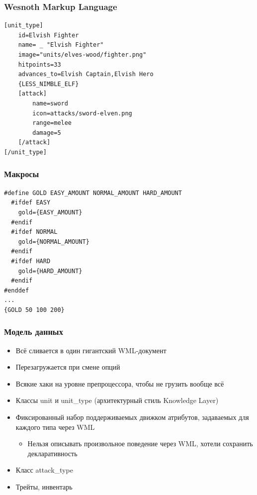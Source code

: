 \documentclass{../../slides-style}
\begin{document}
    \begin{frame}[fragile]
        \frametitle{Wesnoth Markup Language}
        \begin{verbatim}
[unit_type]
    id=Elvish Fighter
    name= _ "Elvish Fighter"
    image="units/elves-wood/fighter.png"
    hitpoints=33
    advances_to=Elvish Captain,Elvish Hero
    {LESS_NIMBLE_ELF}
    [attack]
        name=sword
        icon=attacks/sword-elven.png
        range=melee
        damage=5
    [/attack]
[/unit_type]
        \end{verbatim}
    \end{frame}

    \begin{frame}[fragile]
        \frametitle{Макросы}
        \begin{verbatim}
#define GOLD EASY_AMOUNT NORMAL_AMOUNT HARD_AMOUNT
  #ifdef EASY
    gold={EASY_AMOUNT}
  #endif
  #ifdef NORMAL
    gold={NORMAL_AMOUNT}
  #endif
  #ifdef HARD
    gold={HARD_AMOUNT}
  #endif
#enddef
...
{GOLD 50 100 200}
        \end{verbatim}
    \end{frame}

    \begin{frame}
        \frametitle{Модель данных}
        \begin{itemize}
            \item Всё сливается в один гигантский WML-документ
            \item Перезагружается при смене опций
            \item Всякие хаки на уровне препроцессора, чтобы не грузить вообще всё
            \item Классы unit и unit\_type (архитектурный стиль Knowledge Layer)
            \item Фиксированный набор поддерживаемых движком атрибутов, задаваемых для каждого типа через WML
            \begin{itemize}
                \item Нельзя описывать произвольное поведение через WML, хотели сохранить декларативность
            \end{itemize}
            \item Класс attack\_type
            \item Трейты, инвентарь
        \end{itemize}
    \end{frame}
\end{document}
